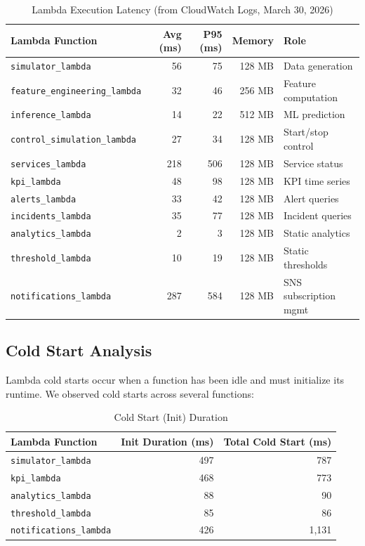 \documentclass[11pt,a4paper]{article}
\begin{document}
\begin{table}[H]
\centering
\begin{tabular}{lrrrl}
\toprule
\textbf{Lambda Function} & \textbf{Avg (ms)} & \textbf{P95 (ms)} & \textbf{Memory} & \textbf{Role} \\
\midrule
\texttt{simulator\_lambda} & 56 & 75 & 128 MB & Data generation \\
\texttt{feature\_engineering\_lambda} & 32 & 46 & 256 MB & Feature computation \\
\texttt{inference\_lambda} & 14 & 22 & 512 MB & ML prediction \\
\texttt{control\_simulation\_lambda} & 27 & 34 & 128 MB & Start/stop control \\
\texttt{services\_lambda} & 218 & 506 & 128 MB & Service status \\
\texttt{kpi\_lambda} & 48 & 98 & 128 MB & KPI time series \\
\texttt{alerts\_lambda} & 33 & 42 & 128 MB & Alert queries \\
\texttt{incidents\_lambda} & 35 & 77 & 128 MB & Incident queries \\
\texttt{analytics\_lambda} & 2 & 3 & 128 MB & Static analytics \\
\texttt{threshold\_lambda} & 10 & 19 & 128 MB & Static thresholds \\
\texttt{notifications\_lambda} & 287 & 584 & 128 MB & SNS subscription mgmt \\
\bottomrule
\end{tabular}
\caption{Lambda Execution Latency (from CloudWatch Logs, March 30, 2026)}
\label{tab:lambda-latency}
\end{table}

\subsection{Cold Start Analysis}

Lambda cold starts occur when a function has been idle and must initialize its runtime. We observed cold starts across several functions:

\begin{table}[H]
\centering
\begin{tabular}{lrr}
\toprule
\textbf{Lambda Function} & \textbf{Init Duration (ms)} & \textbf{Total Cold Start (ms)} \\
\midrule
\texttt{simulator\_lambda} & 497 & 787 \\
\texttt{kpi\_lambda} & 468 & 773 \\
\texttt{analytics\_lambda} & 88 & 90 \\
\texttt{threshold\_lambda} & 85 & 86 \\
\texttt{notifications\_lambda} & 426 & 1,131 \\
\bottomrule
\end{tabular}
\caption{Cold Start (Init) Duration}
\label{tab:cold-start}
\end{table}
\end{document}
